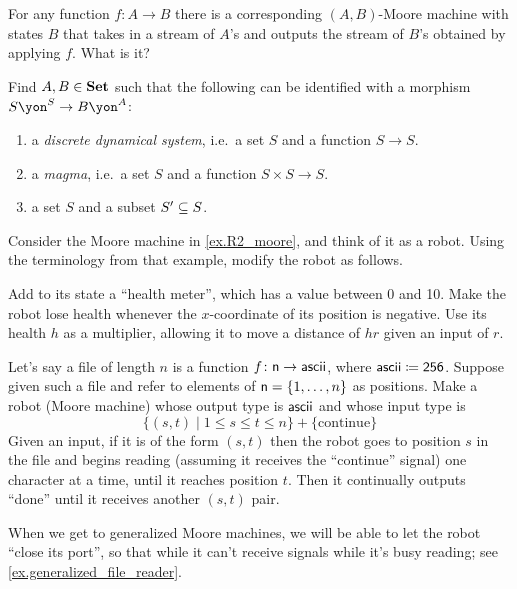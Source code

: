 \documentclass[DynamicalBook]{subfiles}
\begin{document}
\begin{exercise}\label{exc.funs_to_moore}
For any function $f\colon A\to B$ there is a corresponding $(A,B)$-Moore machine with states $B$ that takes in a stream of $A$'s and outputs the stream of $B$'s obtained by applying $f$. What is it?
\end{exercise}

\begin{exercise}
Find $A,B\in\smset$ such that the following can be identified with a morphism $S\yon^S\to B\yon^A$:
\begin{enumerate}
	\item a \emph{discrete dynamical system}, i.e.\ a set $S$ and a function $S\to S$.
	\item a \emph{magma}, i.e.\ a set $S$ and a function $S\times S\to S$.
	\item a set $S$ and a subset $S'\ss S$.
\qedhere
\end{enumerate}
\end{exercise}

\begin{exercise}
Consider the Moore machine in \cref{ex.R2_moore}, and think of it as a robot. Using the terminology from that example, modify the robot as follows.

Add to its state a ``health meter'', which has a value between 0 and 10. Make the robot lose health whenever the $x$-coordinate of its position is negative. Use its health $h$ as a multiplier, allowing it to move a distance of $hr$ given an input of $r$.
\end{exercise}

\begin{exercise}\label{exc.file_reader}
Let's say a file of length $n$ is a function $f\colon\ord{n}\to\Set{ascii}$, where $\Set{ascii}\coloneqq\2\5\6$. Suppose given such a file and refer to elements of $\ord{n}=\{1,\ldots,n\}$ as positions. Make a robot (Moore machine) whose output type is $\Set{ascii}$ and whose input type is
\[
\{(s,t)\mid 1\leq s\leq t\leq n\}+\{\text{continue}\}
\]
Given an input, if it is of the form $(s,t)$ then the robot goes to position $s$ in the file and begins reading (assuming it receives the ``continue'' signal) one character at a time, until it reaches position $t$. Then it continually outputs ``done'' until it receives another $(s,t)$ pair.
\end{exercise}

When we get to generalized Moore machines, we will be able to let the robot ``close its port'', so that while it can't receive signals while it's busy reading; see \cref{ex.generalized_file_reader}.
\end{document}
